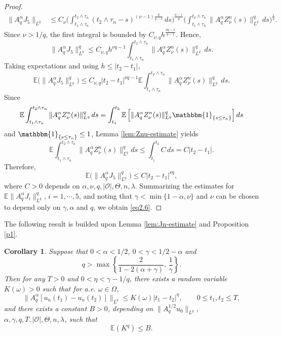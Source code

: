 \documentclass[10pt]{article}
\numberwithin{figure}{section}
\numberwithin{equation}{section}
\newtheorem{corollary}[theorem]{Corollary}
\newcommand{\0}{{\theta}}
\def\gam{\gamma}
\def\a{\alpha}
\begin{document}
\begin{proof}
$$\begin{aligned}
\|A_q^\alpha J_5\|_{L^q}
&\le C_{\nu}
\Bigg(\int_{t_1\wedge\tau_n}^{t_2\wedge\tau_n}
(t_2\wedge\tau_n-s)^{(\nu-1)\frac{q}{q-1}}\,ds\Bigg)^{\frac{q-1}{q}} 
\Bigg(\int_{t_1\wedge\tau_n}^{t_2\wedge\tau_n}
\|A_q^\alpha Z_\nu^n(s)\|_{L^q}^q\,ds\Bigg)^{\frac{1}{q}}.
\end{aligned}
$$
Since $\nu>1/q$, the first integral is bounded by $C_{\nu,q} h^{\frac{\nu q-1}{q-1}}$. Hence,
$$
\|A_q^\alpha J_5\|_{L^q}^q
\le C_{\nu,q} h^{\nu q-1}
\int_{t_1\wedge\tau_n}^{t_2\wedge\tau_n}
\|A_q^\alpha Z_\nu^n(s)\|_{L^q}^q\,ds.
$$
Taking expectations and using $h\le |t_2-t_1|$,
$$
\mathbb{E}\big(\|A_q^\alpha J_5\|_{L^q}^q\big)
\le C_{\nu,q} |t_2-t_1|^{\nu q-1}
\mathbb{E}
\int_{t_1\wedge\tau_n}^{t_2\wedge\tau_n}
\|A_q^\alpha Z_\nu^n(s)\|_{L^q}^q\,ds.
$$
Since
$$
\mathbb{E}
\int_{t_1\wedge\tau_n}^{t_2\wedge\tau_n}
\|A_q^\alpha Z_\nu^n(s)\|_{L^q}^q\,ds
=
\int_{t_1}^{t_2}
\mathbb{E}\left[
\|A_q^\alpha Z_\nu^n(s)\|_{L^q}^q \mathbbm{1}_{\{s\le\tau_n\}}
\right] ds
$$
and $\mathbbm{1}_{\{s\le\tau_n\}}\le1$, Lemma \ref{lem:Znu-estimate} yields
$$
\mathbb{E}\int_{t_1\wedge\tau_n}^{t_2\wedge\tau_n}
\|A_q^\alpha Z_\nu^n(s)\|_{L^q}^q
 ds
\le
\int_{t_1}^{t_2} C\,ds
= C |t_2-t_1|.
$$
Therefore,
$$
\mathbb{E}\big(\|A_q^\alpha J_5\|_{L^q}^q\big)
\le C |t_2-t_1|^{\nu q},
$$
where $C>0$ depends on $\alpha,\nu,q,|\mathcal O|,\Theta,n,\lambda$.
\vs
Summarizing the estimates for $\mathbb{E}\|A_q^\alpha J_i\|_{L^q}^q$, $i=1,\cdots,5$, and noting that $\gamma < \min\{1-\alpha,\nu\}$ and $\nu$ can be chosen to depend only on $\gamma,\alpha$ and $q$, we obtain \eqref{eq2.6}.
\end{proof}
\vs


The following result is builded upon Lemma \ref{lem:Jn-estimate} and Proposition \ref{p1}.
\begin{corollary}\label{c2}
Suppose that $0<\a<1/2$, $0<\gam<1/2-\a$ and$$
q>\max\left\{\frac{2}{1-2(\alpha+\gamma)},\,\frac{1}{\gamma}\right\}.
$$
Then for any $T>0$ and $0<\eta<\gamma-1/q$, there exists  a random variable $K(\omega)>0$ such that for a.e. $\omega\in\Omega$,
$$
\|A_q^{\alpha}[u_n(t_1)-u_n(t_2)]\|_{L^q} \le K(\omega)|t_1-t_2|^\eta, \qquad 0\le t_1,t_2\le T,
$$
and there exists a constant $B>0$, depending on $\|A_q^{1/2}u_0\|_{L^q}$, $\alpha,\gamma,q,T,|\mathcal O|,\Theta,n,\lambda$, such that
$$
\mathbb{E}(K^q) \le B.
$$
\end{corollary}

\end{document}
